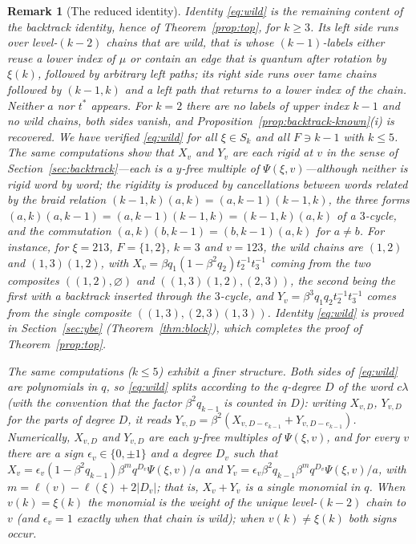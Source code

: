 \documentclass[11pt]{article}
\newtheorem{remark}[proposition]{Remark}
\newcommand{\ellength}{\ell}
\begin{document}
\begin{remark}[The reduced identity]\label{rem:wild}
Identity \eqref{eq:wild} is the remaining content of the backtrack
identity, hence of Theorem~\ref{prop:top}, for $k\geq3$. Its left side
runs over level-$(k-2)$ chains that are wild, that is whose
$(k-1)$-labels either reuse a lower index of $\mu$ or contain an edge
that is quantum after rotation by $\xi(k)$, followed by arbitrary left
paths; its right side runs over tame chains followed by $(k-1,k)$ and
a left path that returns to a lower index of the chain. Neither $a$
nor $t^\ast$ appears. For $k=2$ there are no labels of upper index
$k-1$ and no wild chains, both sides vanish, and
Proposition~\ref{prop:backtrack-known}(i) is recovered. We have
verified \eqref{eq:wild} for all $\xi\in S_k$ and all $F\ni k-1$ with
$k\leq5$. The same computations show that $X_v$ and $Y_v$ are each
rigid at $v$ in the sense of Section~\ref{sec:backtrack}---each is a
$y$-free multiple of $\Psi(\xi,v)$---although neither is rigid word by
word; the rigidity is produced by cancellations between words related
by the braid relation $(k-1,k)(a,k)=(a,k-1)(k-1,k)$, the three forms
$(a,k)(a,k-1)=(a,k-1)(k-1,k)=(k-1,k)(a,k)$ of a $3$-cycle, and the
commutation $(a,k)(b,k-1)=(b,k-1)(a,k)$ for $a\neq b$. For instance,
for $\xi=213$, $F=\{1,2\}$, $k=3$ and $v=123$, the wild chains are
$(1,2)$ and $(1,3)(1,2)$, with
$X_v=\beta q_1(1-\beta^2q_2)t_2^{-1}t_3^{-1}$ coming from the two
composites $((1,2),\varnothing)$ and $((1,3)(1,2),(2,3))$, the second
being the first with a backtrack inserted through the $3$-cycle, and
$Y_v=\beta^3q_1q_2t_2^{-1}t_3^{-1}$ comes from the single composite
$((1,3),(2,3)(1,3))$. Identity \eqref{eq:wild} is proved in
Section~\ref{sec:ybe} (Theorem~\ref{thm:block}), which completes the
proof of Theorem~\ref{prop:top}.

The same computations ($k\leq5$) exhibit a finer structure. Both
sides of \eqref{eq:wild} are polynomials in $q$, so \eqref{eq:wild}
splits according to the $q$-degree $D$ of the word $c\lambda$ (with
the convention that the factor $\beta^2q_{k-1}$ is counted in $D$):
writing $X_{v,D}$, $Y_{v,D}$ for the parts of degree $D$, it reads
$Y_{v,D}=\beta^2(X_{v,D-e_{k-1}}+Y_{v,D-e_{k-1}})$. Numerically,
$X_{v,D}$ and $Y_{v,D}$ are each $y$-free multiples of $\Psi(\xi,v)$,
and for every $v$ there are a sign $\epsilon_v\in\{0,\pm1\}$ and a
degree $D_v$ such that
$X_v=\epsilon_v(1-\beta^2q_{k-1})\beta^{m}q^{D_v}\Psi(\xi,v)/a$ and
$Y_v=\epsilon_v\beta^2q_{k-1}\beta^{m}q^{D_v}\Psi(\xi,v)/a$, with
$m=\ellength(v)-\ellength(\xi)+2|D_v|$; that is, $X_v+Y_v$ is a single
monomial in $q$. When $v(k)=\xi(k)$ the monomial is the weight of the
unique level-$(k-2)$ chain to $v$ (and $\epsilon_v=1$ exactly when
that chain is wild); when $v(k)\neq\xi(k)$ both signs occur.
\end{remark}
\end{document}
